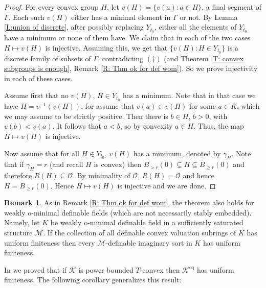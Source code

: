 \documentclass[11pt]{amsart}
\DeclareMathOperator{\eq}{eq}
\theoremstyle{definition}
\newtheorem{remark}[theorem]{Remark}
\newcommand{\CK}{{\mathcal K}}
\newcommand{\CM}{{\mathcal M}}
\newcommand{\CO}{{\mathcal O}}
\newcommand{\0}{\emptyset}
\def\sub{\subseteq}
\begin{document}
\begin{proof}
	For every convex group $H$, let $v(H)=\{v(a):a\in H\}$, a final segment of $\Gamma$. Each such $v(H)$ either has a minimal element in $\Gamma$ or not. By Lemma \ref{L:union of discrete}, after possibly replacing $Y_{t_0}$, either all the elements of $Y_{t_0}$ have a minimum or none of them have. We claim that in each of the two cases $H\mapsto v(H)$ is injective. Assuming this, we get that $\{v(H):H\in Y_{t_0}\}$ is a discrete family of subsets of $\Gamma$,  contradicting $(\dagger)$ (and Theorem \ref{T: convex subgroups is enough}, Remark \ref{R: Thm ok for def wom}). So we prove injectivity in each of these cases.

    
    
	Assume first that no $v(H)$, $H\in Y_{t_0}$ has a minimum. Note that in that case we have $H=v^{-1}(v(H))$, for assume that $v(a)\in v(H)$ for some $a\in K$, which we may assume to be strictly positive.     Then there is $b\in H$, $b>0$, with  $v(b)<v(a)$. It follows that $a<b$, so by convexity $a\in H$. Thus, the map $H\mapsto v(H)$ is injective.
    
    
    
	
    Now assume that for all $H\in Y_{t_0}$,  $v(H)$ has a minimum, denoted by  $\gamma_H$.
	Note that if $\gamma_H=r$ (and recall $H$ is convex) then $B_{>r}(0)\subsetneq H\sub B_{\geq r}(0)$  and therefore $R(H)\subseteq \CO$. By minimality of $\CO$, $R(H)=\CO$ and hence $H=B_{\geq r}(0)$. Hence $H\mapsto v(H)$ is injective and we are done.
\end{proof}

\begin{remark}  
As in Remark \ref{R: Thm ok for def wom}, the theorem also holds for weakly o-minimal definable fields (which are not necessarily stably embedded). Namely, let $K$ be weakly o-minimal definable field in a sufficiently saturated structure $\CM$. If the collection of all definable convex valuation subrings of $K$ has uniform finiteness then every $\CM$-definable imaginary sort in $K$ has uniform finiteness.
\end{remark}


In \cite{HaHaPeSs} we proved that if $\CK$ is power bounded $T$-convex then $\CK^{\eq}$ has uniform finiteness. The following corollary generalizes this result:  
\end{document}
